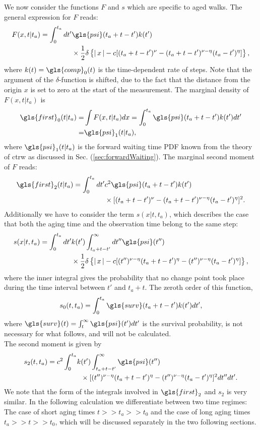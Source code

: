 We now consider the functions $F$ and $s$ which are specific to aged walks. The general expression for $F$ reads: 
\begin{align}
 F(x,t|t_a)= \int_0^{t_a} dt' & \gls{psi}(t_a+t-t') k(t') \\
& \times \frac{1}{2}\delta \left\{\abs{x}
-c[(t_a+t-t')^\nu-(t_a+t-t')^{\nu-\eta} (t_a-t')^\eta]\right\} , \nonumber
\end{align}
where $k(t)=\gls{comp}_{0}(t)$ is the time-dependent rate of steps. Note that the argument of the $\delta$-function is shifted, 
due to the fact that the distance from the origin $x$ is set to zero at the start of the measurement. The marginal density of $F(x,t|t_a)$ is
\begin{align}
\gls{first}_0(t|t_a) =& \int F(x,t|t_a) dx =\int_0^{t_a} \gls{psi}(t_a+t-t') k(t') dt' \nonumber \\
 =& \gls{psi}_1(t|t_a),
\end{align}
where $\gls{psi}_1(t|t_a)$ is the forward waiting time PDF known from the theory of \gls{ctrw} as discussed in Sec. (\ref{sec:forwardWaiting}). The marginal second moment of $F$ reads:
\begin{align}
\gls{first}_2(t|t_a) = \int_0^{t_a} dt' & c^2 \gls{psi}(t_a+t-t') k(t')  \label{eqn:F2} \\ 
& \times [(t_a+t-t')^\nu-(t_a+t-t')^{\nu-\eta} (t_a-t')^\eta]^2 . \nonumber
\end{align}
Additionally we have to consider the term $s(x|t,t_a)$, which describes the case that both the aging time and the observation time belong to the same step:
\begin{align}
 s(x|t,t_a) = \int_0^{t_a} dt' & k(t') \int^{\infty}_{t_a+t-t'} dt'' \gls{psi}(t'')  \\
& \times \frac{1}{2} \delta \left\{\abs{x}-c[(t'')^{\nu-\eta}(t_a+t-t')^\eta-(t'')^{\nu-\eta}(t_a-t')^{\eta}]\right\} , \nonumber 
\end{align}
where the inner integral gives the probability that no change point took place during the time interval between $t'$ and $t_a+t$. The zeroth order of this function,
\begin{equation}
 s_0(t,t_a) = \int_0^{t_a} \gls{surv}(t_a+t-t') k(t') dt'  ,
\end{equation}
where $\gls{surv}(t) = \int_t^\infty \gls{psi}(t') dt'$ is the survival probability,
is not necessary for what follows, and will not be calculated. \\
The second moment is given by
\begin{align}
\begin{split}
 s_2(t,t_a) =c^2 \int_0^{t_a} & k(t') \int^{\infty}_{t_a+t-t'}  \gls{psi}(t'')  \\ 
& \;\; \times [(t'')^{\nu-\eta}(t_a+t-t')^\eta-(t'')^{\nu-\eta}(t_a-t')^{\eta}]^2   dt'' dt'  \label{eqn:s2} .
\end{split}
\end{align}
We note that the form of the integrals involved in $\gls{first}_2$ and $s_2$ is very similar. 
In the following calculation we differentiate between two time regimes: The case of short aging times $t>>t_a>> t_0$ and the case of long aging times $t_a>>t>>t_0$, 
which will be discussed separately in the two following sections. 

